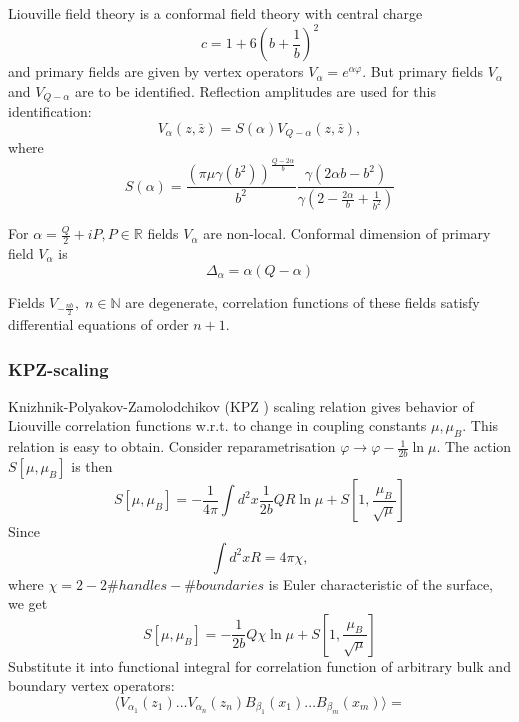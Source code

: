 \documentclass[12pt]{article}
\begin{document}
Liouville field theory is a conformal field theory with central charge
\begin{equation}
  \label{eq:19}
  c=1+6\left(b+\frac{1}{b}\right)^{2}
\end{equation}
and primary fields are given by vertex operators $V_{\alpha}=e^{\alpha\varphi}$. But primary fields
$V_{\alpha}$ and $V_{Q-\alpha}$ are to be identified. 
Reflection amplitudes are used for this identification:
\begin{equation}
  \label{eq:87}
  V_{\alpha}(z,\bar z)=S(\alpha) V_{Q-\alpha}(z,\bar z),
\end{equation}
where
\begin{equation}
  \label{eq:88}
  S(\alpha)=\frac{\left(\pi\mu\gamma(b^{2})\right)^{\frac{Q-2\alpha}{b}}}{b^{2}}
  \frac{\gamma(2\alpha b -b^{2})}{\gamma\left(2-\frac{2\alpha}{b}+\frac{1}{b^{2}}\right)}
\end{equation}


For $\alpha=\frac{Q}{2}+i P, P\in \mathbb{R}$
fields $V_{\alpha}$ are non-local. Conformal dimension of primary field $V_{\alpha}$ is
\begin{equation}
  \label{eq:32}
  \Delta_{\alpha}=\alpha(Q-\alpha)
\end{equation}

Fields $V_{-\frac{nb}{2}}, \; n\in \mathbb{N}$ are degenerate, correlation functions of these fields
satisfy differential equations of order $n+1$. 

\subsubsection{KPZ-scaling}
\label{sec:kpz-scaling}

Knizhnik-Polyakov-Zamolodchikov (KPZ \cite{knizhnik1988fractal}) scaling relation gives behavior of
Liouville correlation functions w.r.t. to change in coupling constants $\mu, \mu_{B}$. This relation
is easy to obtain. Consider reparametrisation $\varphi\to\varphi-\frac{1}{2b}\ln\mu$. The action
$S[\mu,\mu_{B}]$ is then
\begin{equation}
  \label{eq:84}
  S[\mu,\mu_{B}]=-\frac{1}{4\pi}\int d^{2}x \frac{1}{2b}QR\ln\mu+S\left[1,\frac{\mu_{B}}{\sqrt{\mu}}\right]
\end{equation}
Since
\begin{equation}
  \label{eq:85}
  \int d^{2}x R =4\pi\chi,
\end{equation}
where $\chi=2-2\#handles-\#boundaries$ is Euler characteristic of the surface, we get
\begin{equation}
  \label{eq:99}
    S[\mu,\mu_{B}]=-\frac{1}{2b}Q\chi\ln\mu+S\left[1,\frac{\mu_{B}}{\sqrt{\mu}}\right]
\end{equation}
Substitute it into functional integral for correlation function of arbitrary bulk and boundary
vertex operators:
\begin{equation}
  \label{eq:100}
  \langle V_{\alpha_{1}}(z_{1})\dots V_{\alpha_{n}}(z_{n}) B_{\beta_{1}}(x_{1})\dots B_{\beta_{m}}(x_{m})\rangle=
\end{equation}
\end{document}
